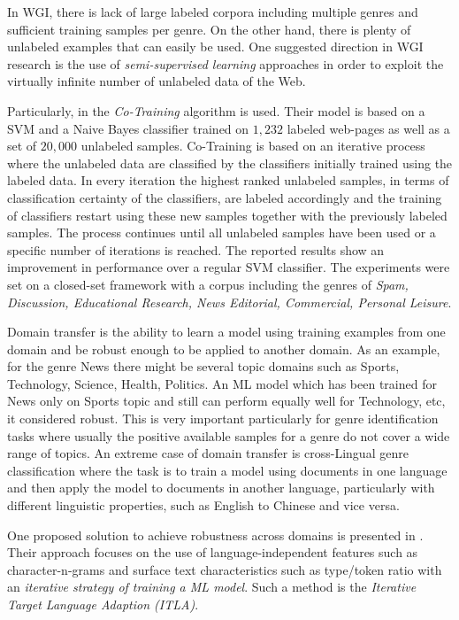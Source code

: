 In WGI, there is lack of large labeled corpora including multiple genres and sufficient training samples per genre. On the other hand, there is plenty of unlabeled examples that can easily be used. One suggested direction in WGI research is the use of \textit{semi-supervised learning} approaches in order to exploit the virtually infinite number of unlabeled data of the Web. 

Particularly, in \parencite{chetry2011web} the \textit{Co-Training} algorithm is used. Their model is based on a SVM and a Naive Bayes classifier trained on $1,232$ labeled web-pages as well as a set of $20,000$ unlabeled samples. Co-Training is based on an iterative process where the unlabeled data are classified by the classifiers initially trained using the labeled data. In every iteration the highest ranked unlabeled samples, in terms of classification certainty of the classifiers, are labeled accordingly and the training of classifiers restart using these new samples together with the previously labeled samples. The process continues until all unlabeled samples have been used or a specific number of iterations is reached. The reported results show an improvement in performance over a regular SVM classifier. The experiments were set on a closed-set framework with a corpus including the genres of \textit{Spam, Discussion, Educational Research, News Editorial, Commercial, Personal Leisure}.

Domain transfer is the ability to learn a model using training examples from one domain and be robust enough to be applied to another domain. As an example, for the genre News there might be several topic domains such as Sports, Technology, Science, Health, Politics. An ML model which has been trained for News only on Sports topic and still can perform equally well for Technology, etc, it considered robust. This is very important particularly for genre identification tasks where usually the positive available samples for a genre do not cover a wide range of topics. An extreme case of domain transfer is cross-Lingual genre classification where the task is to train a model using documents in one language and then apply the model to documents in another language, particularly with different linguistic properties, such as English to Chinese and vice versa.

One proposed solution to achieve robustness across domains is presented in \parencite{petrenz2011stable}. Their approach focuses on the use of language-independent features such as character-n-grams and surface text characteristics such as type/token ratio with an \textit{iterative strategy of training a ML model}. Such a method is the \textit{Iterative Target Language Adaption (ITLA)}. 

